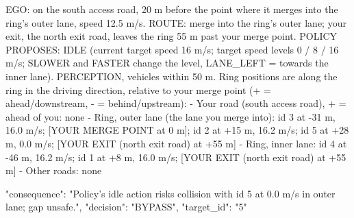 \documentclass[11pt]{article}
\begin{document}
\begin{ModelInput}[formatcom=\color{red}]
EGO: on the south access road, 20 m before the point where it merges into the ring's outer lane,
    speed 12.5 m/s.
ROUTE: merge into the ring's outer lane; your exit, the north exit road, leaves the ring 55 m
    past your merge point.
POLICY PROPOSES: IDLE (current target speed 16 m/s; target speed levels 0 / 8 / 16 m/s; SLOWER
    and FASTER change the level, LANE_LEFT = towards the inner lane).
PERCEPTION, vehicles within 50 m. Ring positions are along the ring in the driving direction,
    relative to your merge point (+ = ahead/downstream, - = behind/upstream):
- Your road (south access road), + = ahead of you: none
- Ring, outer lane (the lane you merge into): id 3 at -31 m, 16.0 m/s; [YOUR MERGE POINT at 0
    m]; id 2 at +15 m, 16.2 m/s; id 5 at +28 m, 0.0 m/s; [YOUR EXIT (north exit road) at +55 m]
- Ring, inner lane: id 4 at -46 m, 16.2 m/s; id 1 at +8 m, 16.0 m/s; [YOUR EXIT (north exit
    road) at +55 m]
- Other roads: none
\end{ModelInput}

\begin{ModelResponse}[formatcom=\color{red}]
{"consequence": "Policy's idle action risks collision with id 5 at 0.0 m/s in outer lane; gap
    unsafe.", "decision": "BYPASS", "target_id": "5"}
\end{ModelResponse}
\end{document}
